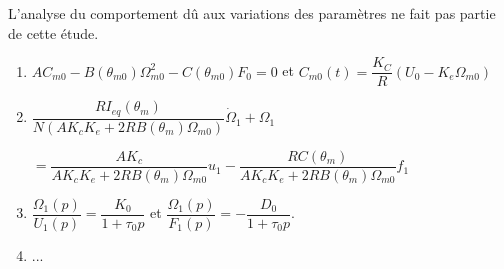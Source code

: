  \begin{rem}L’analyse du comportement dû aux variations des paramètres ne
fait pas partie de cette étude.
\end{rem}



\ifprof
\begin{corrige}
\end{corrige}
\else
\fi


\begin{enumerate}
\item $AC_{m0}-B\left( \theta_{m0}\right) \Omega_{m0}^2-C\left( \theta_{m0}\right)F_0 = 0 $ et $C_{m0}(t)=\dfrac{K_C}{R}\left(U_0-K_e\Omega_{m0}\right)$
\item $\dfrac{RI_{eq}\left( \theta_m\right)}{N\left( AK_cK_e+2RB\left( \theta_m\right)\Omega_{m0}\right)} \dot{\Omega}_1+\Omega_1 $

 $= 
\dfrac{AK_c}{ AK_cK_e+2RB\left( \theta_m\right)\Omega_{m0}} u_1
- \dfrac{RC\left( \theta_m\right)}{ AK_cK_e+2RB\left( \theta_m\right)\Omega_{m0}} f_1$
\item $\dfrac{\Omega_1(p)}{U_1(p)}=\dfrac{K_0}{1+\tau_0 p}$ et $\dfrac{\Omega_1(p)}{F_1(p)}=-\dfrac{D_0}{1+\tau_0 p}$.
\item ...
\end{enumerate}

